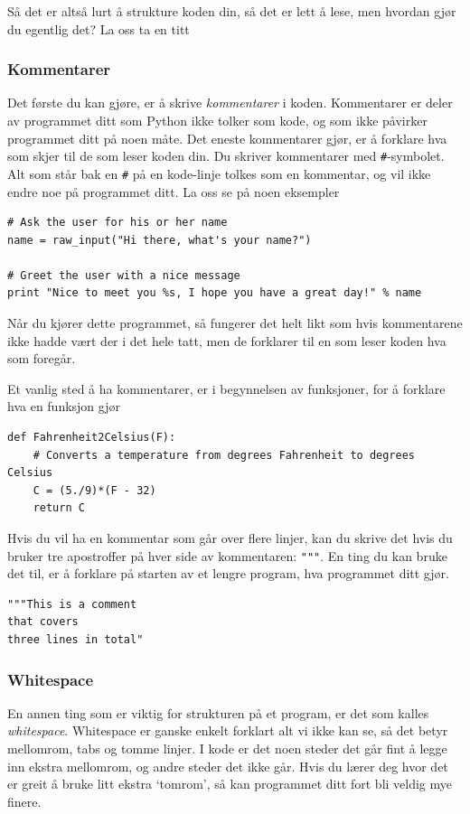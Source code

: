 \documentclass[a4paper, 11pt, notitlepage]{article}
\begin{document}
Så det er altså lurt å strukture koden din, så det er lett å lese, men hvordan gjør du egentlig det? La oss ta en titt

\subsubsection*{Kommentarer}
Det første du kan gjøre, er å skrive \emph{kommentarer} i koden. Kommentarer er deler av programmet ditt som Python ikke tolker som kode, og som ikke påvirker programmet ditt på noen måte. Det eneste kommentarer gjør, er å forklare hva som skjer til de som leser koden din. Du skriver kommentarer med \verb+#+-symbolet. Alt som står bak en \verb+#+ på en kode-linje tolkes som en kommentar, og vil ikke endre noe på programmet ditt. La oss se på noen eksempler
\begin{lstlisting}
# Ask the user for his or her name
name = raw_input("Hi there, what's your name?")

# Greet the user with a nice message
print "Nice to meet you %s, I hope you have a great day!" % name
\end{lstlisting}
Når du kjører dette programmet, så fungerer det helt likt som hvis kommentarene ikke hadde vært der i det hele tatt, men de forklarer til en som leser koden hva som foregår.

Et vanlig sted å ha kommentarer, er i begynnelsen av funksjoner, for å forklare hva en funksjon gjør
\begin{lstlisting}
def Fahrenheit2Celsius(F):
	# Converts a temperature from degrees Fahrenheit to degrees Celsius
	C = (5./9)*(F - 32)
	return C
\end{lstlisting}

Hvis du vil ha en kommentar som går over flere linjer, kan du skrive det hvis du bruker tre apostroffer på hver side av kommentaren: \verb+"""+. En ting du kan bruke det til, er å forklare på starten av et lengre program, hva programmet ditt gjør.
\begin{lstlisting}
"""This is a comment 
that covers 
three lines in total"
\end{lstlisting}

\subsubsection*{Whitespace}

En annen ting som er viktig for strukturen på et program, er det som kalles \emph{whitespace}. Whitespace er ganske enkelt forklart alt vi ikke kan se, så det betyr mellomrom, tabs og tomme linjer. I kode er det noen steder det går fint å legge inn ekstra mellomrom, og andre steder det ikke går. Hvis du lærer deg hvor det er greit å bruke litt ekstra `tomrom', så kan programmet ditt fort bli veldig mye finere.
\end{document}
